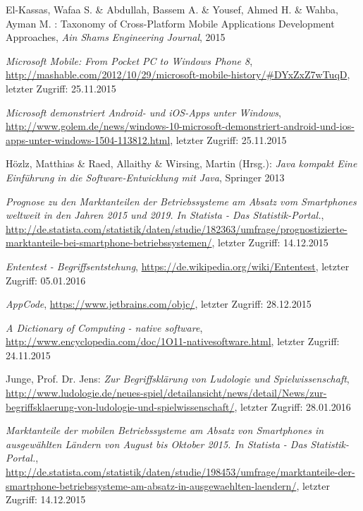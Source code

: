 \begin{thebibliography}{}
El-Kassas, Wafaa S. \& Abdullah, Bassem A. \&  Yousef, Ahmed H. \&  Wahba, Ayman M. :
\glqq Taxonomy of Cross-Platform Mobile Applications Development Approaches\grqq, 
\emph{Ain Shams Engineering Journal}, 2015

\emph{Microsoft Mobile: From Pocket PC to Windows Phone 8},
\url{http://mashable.com/2012/10/29/microsoft-mobile-history/#DYxZxZ7wTuqD}, letzter Zugriff: 25.11.2015

\emph{Microsoft demonstriert Android- und iOS-Apps unter Windows},
\url{http://www.golem.de/news/windows-10-microsoft-demonstriert-android-und-ios-apps-unter-windows-1504-113812.html}, letzter Zugriff: 25.11.2015

Hözlz, Matthias \& Raed, Allaithy \& Wirsing, Martin (Hrsg.): 
\emph{Java kompakt Eine Einführung in die Software-Entwicklung
	mit Java}, Springer 2013

\emph{Prognose zu den Marktanteilen der Betriebssysteme am Absatz vom Smartphones weltweit in den Jahren 2015 und 2019. In Statista - Das Statistik-Portal.},
\url{http://de.statista.com/statistik/daten/studie/182363/umfrage/prognostizierte-marktanteile-bei-smartphone-betriebssystemen/}, letzter Zugriff: 14.12.2015

\emph{Ententest - Begriffsentstehung},
\url{https://de.wikipedia.org/wiki/Ententest}, letzter Zugriff: 05.01.2016

\emph{AppCode},
\url{https://www.jetbrains.com/objc/}, letzter Zugriff: 28.12.2015

\emph{A Dictionary of Computing - native software},
\url{http://www.encyclopedia.com/doc/1O11-nativesoftware.html}, letzter Zugriff: 24.11.2015

Junge, Prof. Dr. Jens:
\emph{Zur Begriffsklärung von Ludologie und Spielwissenschaft},
\url{http://www.ludologie.de/neues-spiel/detailansicht/news/detail/News/zur-begriffsklaerung-von-ludologie-und-spielwissenschaft/}, letzter Zugriff: 28.01.2016

\emph{Marktanteile der mobilen Betriebssysteme am Absatz von Smartphones in ausgewählten Ländern von August bis Oktober 2015. In Statista - Das Statistik-Portal.},
\url{http://de.statista.com/statistik/daten/studie/198453/umfrage/marktanteile-der-smartphone-betriebssysteme-am-absatz-in-ausgewaehlten-laendern/}, letzter Zugriff: 14.12.2015


\end{thebibliography}
